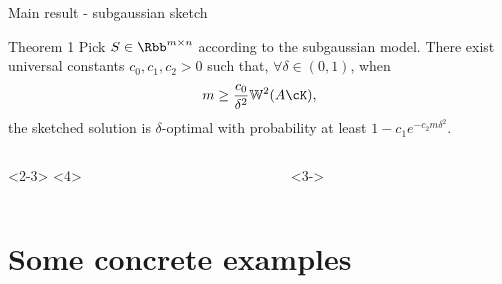 \documentclass[10pt]{beamer}
\begin{document}
\begin{frame}{Main result - subgaussian sketch}
    \begin{block}{Theorem 1}
        Pick $S \in \Rbb^{m \times n}$ according to the subgaussian model.
        There exist universal constants $c_0, c_1,
        c_2 > 0$ such that, $\forall \delta \in (0, 1)$, when
        \[
            m \geq \frac{c_0}{\delta^2} \mathbb{W}^2(A \cK), \]
        the sketched solution is $\delta$-optimal with probability at least
        \(
            1 - c_1 e^{-c_2 m \delta^2}.
        \)
    \end{block}
    \vspace{1em}
    \begin{columns}
        \begin{column}{0.49 \textwidth}
            \centering
            \only{
            \begin{tikzpicture}[scale=1.1]
                \duck[speech={\scriptsize So what?},
                      bubblecolour=white!35!cred!25,
                      squareglasses=blue!50!black]
            \end{tikzpicture}}<2-3>
            \only{
            \begin{tikzpicture}[scale=1.1]
                \duck[speech={\tiny $
                    \substack{\text{Sounds sketchy,}\\\text{but OK}}$},
                      bubblecolour=white!35!cred!25,
                      squareglasses=blue!50!black]
            \end{tikzpicture}}<4>
        \end{column}
        \begin{column}{0.49 \textwidth}
            <3->
        \end{column}
    \end{columns}
\end{frame}

\section{Some concrete examples}
\end{document}
